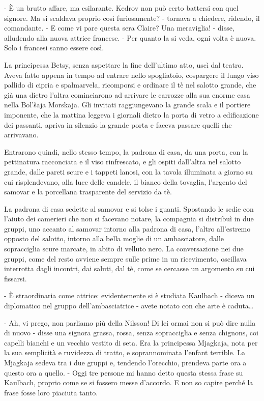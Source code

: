 - È un brutto affare, ma esilarante. Kedrov non può certo battersi con quel signore. Ma si scaldava proprio così furiosamente? - tornava a chiedere, ridendo, il comandante. - E come vi pare questa sera Claire? Una meraviglia! - disse, alludendo alla nuova attrice francese. - Per quanto la si veda, ogni volta è nuova. Solo i francesi sanno essere così. 

La principessa Betsy, senza aspettare la fine dell'ultimo atto, uscì dal teatro. Aveva fatto appena in tempo ad entrare nello spogliatoio, cospargere il lungo viso pallido di cipria e spalmarvela, ricomporsi e ordinare il tè nel salotto grande, che già una dietro l'altra cominciarono ad arrivare le carrozze alla sua enorme casa nella Bol'šaja Morskaja. Gli invitati raggiungevano la grande scala e il portiere imponente, che la mattina leggeva i giornali dietro la porta di vetro a edificazione dei passanti, apriva in silenzio la grande porta e faceva passare quelli che arrivavano. 

Entrarono quindi, nello stesso tempo, la padrona di casa, da una porta, con la pettinatura racconciata e il viso rinfrescato, e gli ospiti dall'altra nel salotto grande, dalle pareti scure e i tappeti lanosi, con la tavola illuminata a giorno su cui risplendevano, alla luce delle candele, il bianco della tovaglia, l'argento del samovar e la porcellana trasparente del servizio da tè. 

La padrona di casa sedette al samovar e si tolse i guanti. Spostando le sedie con l'aiuto dei camerieri che non si facevano notare, la compagnia si distribuì in due gruppi, uno accanto al samovar intorno alla padrona di casa, l'altro all'estremo opposto del salotto, intorno alla bella moglie di un ambasciatore, dalle sopracciglia scure marcate, in abito di velluto nero. La conversazione nei due gruppi, come del resto avviene sempre sulle prime in un ricevimento, oscillava interrotta dagli incontri, dai saluti, dal tè, come se cercasse un argomento su cui fissarsi. 

- È straordinaria come attrice: evidentemente si è studiata Kaulbach - diceva un diplomatico nel gruppo dell'ambasciatrice - avete notato con che arte è caduta\ldots{} 

- Ah, vi prego, non parliamo più della Nilsson! Di lei ormai non si può dire nulla di nuovo - disse una signora grassa, rossa, senza sopracciglia e senza chignons, coi capelli bianchi e un vecchio vestito di seta. Era la principessa Mjagkaja, nota per la sua semplicità e ruvidezza di tratto, e soprannominata l'enfant terrible. La Mjagkaja sedeva tra i due gruppi e, tendendo l'orecchio, prendeva parte ora a questo ora a quello. - Oggi tre persone mi hanno detto questa stessa frase su Kaulbach, proprio come se si fossero messe d'accordo. E non so capire perché la frase fosse loro piaciuta tanto. 

